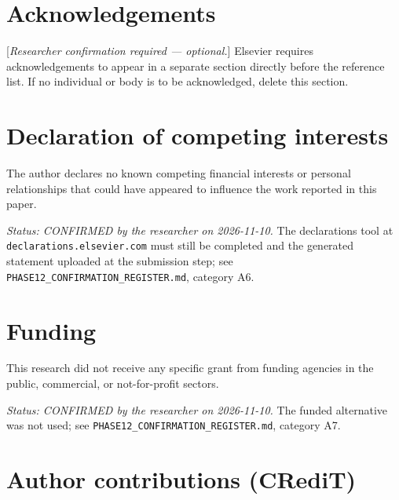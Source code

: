 \documentclass[11pt,a4paper]{article}
\theoremstyle{plain}
\theoremstyle{definition}
\theoremstyle{remark}
\begin{document}

\section*{Acknowledgements}
\label{sec:acknowledgements}

[\emph{Researcher confirmation required --- optional.}] Elsevier requires
acknowledgements to appear in a separate section directly before the reference
list. If no individual or body is to be acknowledged, delete this section.

\section*{Declaration of competing interests}
\label{sec:competinginterests}

The author declares no known competing financial interests or personal
relationships that could have appeared to influence the work reported in
this paper.

\emph{Status: CONFIRMED by the researcher on 2026-11-10.} The declarations
tool at \texttt{declarations.elsevier.com} must still be completed and the
generated statement uploaded at the submission step; see
\texttt{PHASE12\_CONFIRMATION\_REGISTER.md}, category A6.

\section*{Funding}
\label{sec:funding}

This research did not receive any specific grant from funding agencies in the
public, commercial, or not-for-profit sectors.

\emph{Status: CONFIRMED by the researcher on 2026-11-10.} The funded
alternative was not used; see
\texttt{PHASE12\_CONFIRMATION\_REGISTER.md}, category A7.

\section*{Author contributions (CRediT)}
\label{sec:credit}
\end{document}
